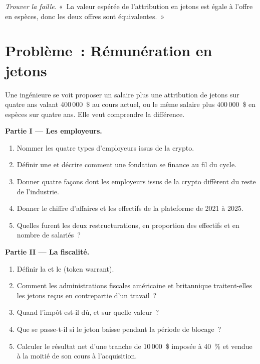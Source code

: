 \begin{exercise}[$\star\star\star$]\label{exo:in:crypto-native-firms:8}
\emph{Trouver la faille.} «~La valeur espérée de l'attribution en jetons est égale à l'offre en espèces, donc les deux offres sont équivalentes.~»
\end{exercise}

\section{Problème~: Rémunération en jetons}

\begin{problem}\label{pb:in:crypto-native-firms:1}
Une ingénieure se voit proposer un salaire plus une attribution de jetons sur quatre ans valant 400\,000~\$ au cours actuel, ou le même salaire plus
400\,000~\$ en espèces sur quatre ans. Elle veut comprendre la différence.

\medskip\noindent\textbf{Partie I --- Les employeurs.}
\begin{enumerate}
\item Nommer les quatre types d'employeurs issus de la crypto.
\item Définir une  et décrire comment une fondation se finance au fil du cycle.
\item Donner quatre façons dont les employeurs issus de la crypto diffèrent du reste de l'industrie.
\item Donner le chiffre d'affaires et les effectifs de la plateforme de 2021 à 2025.
\item Quelles furent les deux restructurations, en proportion des effectifs et en nombre de salariés~?
\end{enumerate}

\medskip\noindent\textbf{Partie II --- La fiscalité.}
\begin{enumerate}[resume]
\item Définir la  et le  (token warrant).
\item Comment les administrations fiscales américaine et britannique traitent-elles les jetons reçus en contrepartie d'un travail~?
\item Quand l'impôt est-il dû, et sur quelle valeur~?
\item Que se passe-t-il si le jeton baisse pendant la période de blocage~?
\item Calculer le résultat net d'une tranche de 10\,000~\$ imposée à 40~\% et vendue à la moitié de son cours à l'acquisition.
\end{enumerate}


\end{problem}
